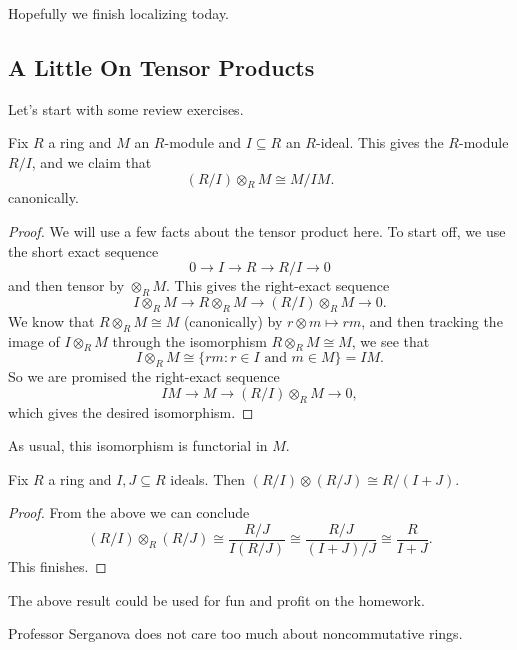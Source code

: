 
Hopefully we finish localizing today.

\subsection{A Little On Tensor Products}
Let's start with some review exercises.
\begin{prop}
	Fix $R$ a ring and $M$ an $R$-module and $I\subseteq R$ an $R$-ideal. This gives the $R$-module $R/I$, and we claim that
	\[(R/I)\otimes_RM\cong M/IM.\]
	canonically.
\end{prop}
\begin{proof}
	We will use a few facts about the tensor product here. To start off, we use the short exact sequence
	\[0\to I\to R\to R/I\to0\]
	and then tensor by $\otimes_RM$. This gives the right-exact sequence
	\[I\otimes_RM\to R\otimes_RM\to (R/I)\otimes_RM\to0.\]
	We know that $R\otimes_RM\cong M$ (canonically) by $r\otimes m\mapsto rm$, and then tracking the image of $I\otimes_RM$ through the isomorphism $R\otimes_RM\cong M$, we see that
	\[I\otimes_RM\cong\{rm:r\in I\text{ and }m\in M\}=IM.\]
	So we are promised the right-exact sequence
	\[IM\to M\to(R/I)\otimes_RM\to0,\]
	which gives the desired isomorphism.
\end{proof}
\begin{remark}[Nir]
	As usual, this isomorphism is functorial in $M$.
\end{remark}
\begin{corollary}
	Fix $R$ a ring and $I,J\subseteq R$ ideals. Then $(R/I)\otimes(R/J)\cong R/(I+J)$.
\end{corollary}
\begin{proof}
	From the above we can conclude
	\[(R/I)\otimes_R(R/J)\cong\frac{R/J}{I(R/J)}\cong\frac{R/J}{(I+J)/J}\cong\frac R{I+J}.\]
	This finishes.
\end{proof}
The above result could be used for fun and profit on the homework.
\begin{remark}
	Professor Serganova does not care too much about noncommutative rings.
\end{remark}

